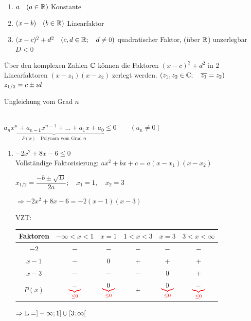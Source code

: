 \begin{enumerate}[A)]

	\begin{enumerate}[1.]
		\item $a\quad(a\in\mathbb{R})$ Konstante
		\item $(x-b)\quad(b\in\mathbb{R})$ Linearfaktor
		\item $(x-c)^2+d^2\quad(c,d\in\mathbb{R};\quad d\ne0)$ quadratischer Faktor, (über $\mathbb{R}$) unzerlegbar $D<0$
	\end{enumerate}
	
	\Bem Über den komplexen Zahlen $\mathbb{C}$ können die Faktoren $(x-c)^2+d^2$ in $2$ Linearfaktoren $(x-z_1)(x-z_2)$ zerlegt werden. $(z_1,z_2\in\mathbb{C};\quad \overline{z_1}=z_2)$\\
	$z_{1/2}=c\pm \imath d$
	
	{\bf \item Ungleichung vom Grad $n$}\\
	$\underbrace{a_nx^n+a_{n-1}x^{n-1}+\ldots+a_1x+a_0}_{P(x)\quad\text{Polynom vom Grad }n} \le 0\qquad (a_n\ne0)$
	
	\clearpage
	\Bsps
	\begin{enumerate}[1.]
		\item $-2x^2+8x-6\le0$\\
		Vollständige Faktorisierung: $ax^2+bx+c=a(x-x_1)(x-x_2)$
		
		$x_{1/2}=\dfrac{-b\pm\sqrt{D}}{2a}; \quad x_1=1,\quad x_2=3$
		
		$\Rightarrow -2x^2+8x-6 = -2(x-1)(x-3)$
		
		VZT:\\
		\begin{tabular}{c|c|c|c|c|c}
			Faktoren & $-\infty<x<1$ & $x=1$ & $1<x<3$ & $x=3$ & $3<x<\infty$\\
			\hline
			$-2$ & $-$ & $-$ & $-$ & $-$ & $-$ \\
			$x - 1$ & $-$ & $0$ & $+$ & $+$ & $+$ \\
			$x - 3$ & $-$ & $-$ & $-$ & $0$ & $+$ \\
			\hline
			$P(x)$ & $\textcolor{red}{\underbrace{\textcolor{black}{-}}_{\le0}}$ & $\textcolor{red}{\underbrace{\textcolor{black}{0}}_{\le0}}$ & $+$ & $\textcolor{red}{\underbrace{\textcolor{black}{0}}_{\le0}}$ & $\textcolor{red}{\underbrace{\textcolor{black}{-}}_{\le0}}$ \\
		\end{tabular}
		
		$\Rightarrow \mathbb{L}=]-\infty;1] \cup [3;\infty[$
		

\end{enumerate}
\end{enumerate}

